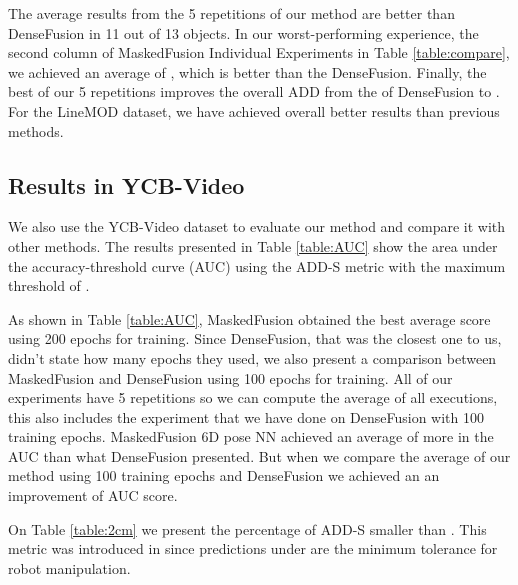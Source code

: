 \documentclass[runningheads]{llncs}
\begin{document}
The average results from the 5 repetitions of our method are better than DenseFusion in 11 out of 13 objects.
In our worst-performing experience, the second column of MaskedFusion Individual Experiments in Table \ref{table:compare}, we achieved an average of , which is better than the DenseFusion.
Finally, the best of our 5 repetitions improves the overall ADD from the  of DenseFusion to .
For the LineMOD dataset, we have achieved overall better results than previous methods.

\subsection{Results in YCB-Video}
We also use the YCB-Video dataset to evaluate our method and compare it with other methods.
The results presented in Table \ref{table:AUC} show the area under the accuracy-threshold curve (AUC) using the ADD-S metric with the maximum threshold of .

As shown in Table \ref{table:AUC}, MaskedFusion obtained the best average score using 200 epochs for training.
Since DenseFusion, that was the closest one to us, didn't state how many epochs they used, we also present a comparison between MaskedFusion and DenseFusion using 100 epochs for training.
All of our experiments have 5 repetitions so we can compute the average of all executions, this also includes the experiment that we have done on DenseFusion with 100 training epochs.
MaskedFusion 6D pose NN achieved an average of more  in the AUC than what DenseFusion presented.
But when we compare the average of our method using 100 training epochs and DenseFusion we achieved an an improvement of  AUC score.

On Table \ref{table:2cm} we present the percentage of ADD-S smaller than .
This metric was introduced in \cite{densefusion} since predictions under  are the minimum tolerance for robot manipulation.
\end{document}
